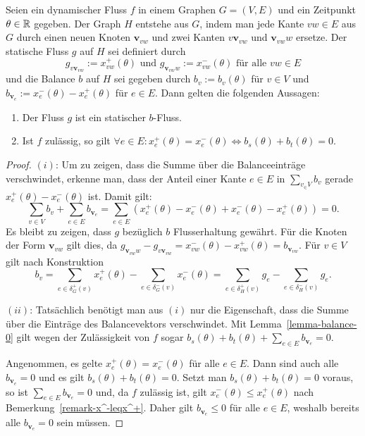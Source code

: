 \newcommand{\newv}{\mathbf{v}}
\begin{lemma}\label{lemma-b-graph}
	Seien ein dynamischer Fluss $f$ in einem Graphen $G=(V,E)$ und ein Zeitpunkt $\theta\in\mathbb{R}$ gegeben.
	Der Graph $H$ entstehe aus $G$, indem man jede Kante $vw\in E$ aus $G$ durch einen neuen Knoten $\newv_{vw}$ und zwei Kanten $v\newv_{vw}$ und $\newv_{vw}w$ ersetze.
	Der statische Fluss $g$ auf $H$ sei definiert durch
	$$g_{v\newv_{vw}} := x_{vw}^+(\theta) \text{ und } g_{\newv_{vw}w} := x_{vw}^-(\theta) \text{ für alle $vw\in E$}$$
	und die Balance $b$ auf $H$ sei gegeben durch $b_v:= b_v(\theta)$ für $v\in V$ und $b_{\newv_e}:= x_e^-(\theta) - x_e^+(\theta)$ für $e\in E$.
	Dann gelten die folgenden Aussagen:
	
	\begin{enumerate}[label=(\roman*)]
		\item Der Fluss $g$ ist ein statischer $b$-Fluss.
		\item\label{lemma-b-graph-imp} Ist $f$ zulässig, so gilt $\forall e\in E : x_e^+(\theta) = x_e^-(\theta)\iff b_s(\theta) + b_t(\theta) = 0$.
	\end{enumerate}
\end{lemma} 
\begin{proof}
	$(i)$: Um zu zeigen, dass die Summe über die Balanceeinträge verschwindet, erkenne man, dass der Anteil einer Kante $e\in E$ in $\sum_{v_\in V} b_v$ gerade $x_e^+(\theta) - x_e^-(\theta)$ ist.
	Damit gilt:
		$$\sum_{v\in V}b_v + \sum_{e\in E} b_{\newv_e} = \sum_{e\in E}  (x_e^+(\theta) - x_e^-(\theta) + x_e^-(\theta) - x_e^+(\theta)) = 0.$$
		Es bleibt zu zeigen, dass $g$ bezüglich $b$ Flusserhaltung gewährt.
		Für die Knoten der Form $\newv_{vw}$ gilt dies, da $g_{\newv_{vw}w} - g_{v\newv_{vw}} = x_{vw}^-(\theta) - x_{vw}^+(\theta) = b_{\newv_{vw}}$.
		Für $v\in V$ gilt nach Konstruktion $$b_v =
		\sum_{e\in\delta^+_G(v)} x_{e}^+(\theta) - \sum_{e\in\delta^-_G(v)} x_{e}^-(\theta) =
	\sum_{e\in\delta_H^+(v)} g_e - \sum_{e\in\delta^-_H(v)}g_e
		.$$
	
	$(ii)$: Tatsächlich benötigt man aus $(i)$ nur die Eigenschaft, dass die Summe über die Einträge des Balancevektors verschwindet.
	Mit Lemma~\ref{lemma-balance-0} gilt wegen der Zulässigkeit von $f$ sogar $b_s(\theta)+b_t(\theta) + \sum_{e\in E} b_{\newv_e} = 0$.
	
	Angenommen, es gelte $x_e^+(\theta) = x_e^-(\theta)$ für alle $e\in E$.
	Dann sind auch alle $b_{\newv_e} = 0$ und es gilt $b_s(\theta) + b_t(\theta) = 0$.
	Setzt man $b_s(\theta) + b_t(\theta) = 0$ voraus, so ist $\sum_{e\in E} b_{\newv_e} = 0$ und, da $f$ zulässig ist, gilt $x_e^-(\theta)\leq x_e^+(\theta)$ nach Bemerkung~\ref{remark-x^-leqx^+}.
	Daher gilt $b_{\newv_e}\leq 0$ für alle $e\in E$, weshalb bereits alle $b_{\newv_e} = 0$ sein müssen.
\end{proof}


